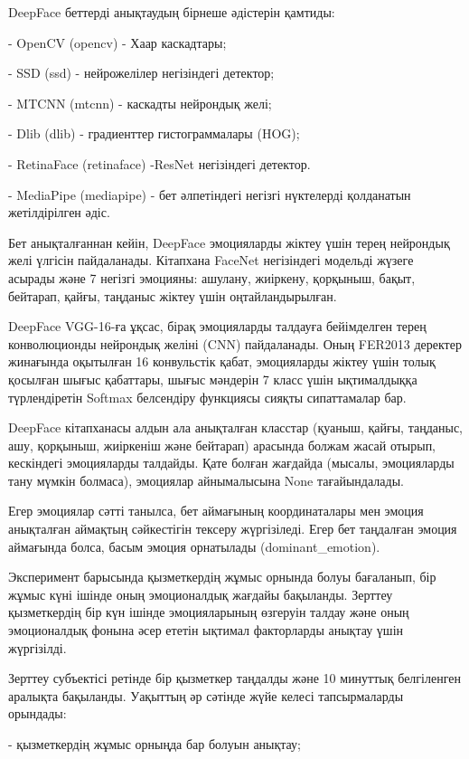 \begin{multicols}{2}
DeepFace беттерді анықтаудың бірнеше әдістерін қамтиды:

- OpenCV (opencv) - Хаар каскадтары;

- SSD (ssd) - нейрожелілер негізіндегі детектор;

- MTCNN (mtcnn) - каскадты нейрондық желі;

- Dlib (dlib) - градиенттер гистограммалары (HOG);

- RetinaFace (retinaface) -ResNet негізіндегі детектор.

- MediaPipe (mediapipe) - бет әлпетіндегі негізгі нүктелерді қолданатын
жетілдірілген әдіс.

Бет анықталғаннан кейін, DeepFace эмоцияларды жіктеу үшін терең
нейрондық желі үлгісін пайдаланады. Кітапхана FaceNet негізіндегі
модельді жүзеге асырады және 7 негізгі эмоцияны: ашулану, жиіркену,
қорқыныш, бақыт, бейтарап, қайғы, таңданыс жіктеу үшін оңтайландырылған.

DeepFace VGG-16-ға ұқсас, бірақ эмоцияларды талдауға бейімделген терең
конволюционды нейрондық желіні (CNN) пайдаланады. Оның FER2013 деректер
жинағында оқытылған 16 конвульстік қабат, эмоцияларды жіктеу үшін толық
қосылған шығыс қабаттары, шығыс мәндерін 7 класс үшін ықтималдыққа
түрлендіретін Softmax белсендіру функциясы сияқты сипаттамалар бар.

DeepFace кітапханасы алдын ала анықталған класстар (қуаныш, қайғы,
таңданыс, ашу, қорқыныш, жиіркеніш және бейтарап) арасында болжам жасай
отырып, кескіндегі эмоцияларды талдайды. Қате болған жағдайда (мысалы,
эмоцияларды тану мүмкін болмаса), эмоциялар айнымалысына None
тағайындалады.

Егер эмоциялар сәтті танылса, бет аймағының координаталары мен эмоция
анықталған аймақтың сәйкестігін тексеру жүргізіледі. Егер бет таңдалған
эмоция аймағында болса, басым эмоция орнатылады (dominant\_emotion).

Эксперимент барысында қызметкердің жұмыс орнында болуы бағаланып, бір
жұмыс күні ішінде оның эмоционалдық жағдайы бақыланды. Зерттеу
қызметкердің бір күн ішінде эмоцияларының өзгеруін талдау және оның
эмоционалдық фонына әсер ететін ықтимал факторларды анықтау үшін
жүргізілді.

Зерттеу субъектісі ретінде бір қызметкер таңдалды және 10 минуттық
белгіленген аралықта бақыланды. Уақыттың әр сәтінде жүйе келесі
тапсырмаларды орындады:

- қызметкердің жұмыс орныңда бар болуын анықтау;


\end{multicols}
